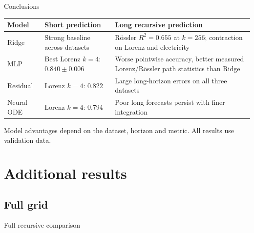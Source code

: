 \documentclass[aspectratio=169,11pt]{beamer}
\begin{document}
\begin{frame}{Conclusions}
\begin{table}
\centering\small
\renewcommand{\arraystretch}{1.2}
\begin{tabular}{p{}p{}p{}}
\toprule
Model & Short prediction & Long recursive prediction \\
\midrule
Ridge & Strong baseline across datasets & R\"ossler $R^2=0.655$ at $k=256$; contraction on Lorenz and electricity \\
MLP & Best Lorenz $k=4$: $0.840\pm0.006$ & Worse pointwise accuracy, better measured Lorenz/R\"ossler path statistics than Ridge \\
Residual & Lorenz $k=4$: 0.822 & Large long-horizon errors on all three datasets \\
Neural ODE & Lorenz $k=4$: 0.794 & Poor long forecasts persist with finer integration \\
\bottomrule
\end{tabular}
\end{table}
Model advantages depend on the dataset, horizon and metric. All results use validation data.
\end{frame}

\appendix
\section{Additional results}
\subsection{Full grid}
\begin{frame}{Full recursive comparison}
\begin{table}
\centering\scriptsize
\setlength{\tabcolsep}{3pt}

\caption{Same reporting starts for every model and horizon. Neural values show mean $\pm$ sample seed standard deviation. The training-target mean scores zero.}
\end{table}
\end{frame}
\end{document}
